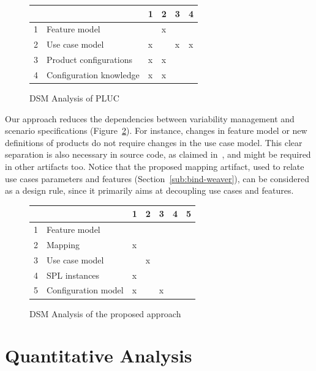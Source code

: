 \documentclass[11pt]{report}
\begin{document}
\begin{figure}[htb]
\centering
\begin{small}
\begin{tabular}{llllll} \hline
&  & 1 & 2 & 3 & 4 \\ \hline
1 & Feature model 			& 	& x	& 	&   	\\ 
2 & Use case model 		& x 	&  	&  x	&  x  \\ 
3 & Product configurations	& x 	& x	& 	&    	\\
4 & Configuration knowledge 	& x 	& x 	& 	&    	\\ \hline
\end{tabular}
\end{small}
 \caption{DSM Analysis of PLUC}
\label{dsm:pluc}
\end{figure}

Our approach reduces the dependencies between variability management and scenario specifications 
(Figure~\ref{dsm:cc}). For instance, changes in feature model or new definitions of products do not require changes in the use case model. This clear separation is also necessary in source code, as claimed in~\cite{alves-gpce-06, apel-icse2006}, and might be required in other artifacts too. Notice that the proposed mapping artifact, used to relate use cases parameters and features (Section~\ref{sub:bind-weaver}), can be considered as a design rule, since it primarily aims at decoupling use cases and features.  

\begin{figure}[h]
\centering
\begin{small}
\begin{tabular}{lllllll} \hline
& & 1 & 2 & 3 & 4 & 5 \\ \hline
1 & Feature model 		& 	& 	&      &  	&  	\\ 
2 & Mapping	 		& x	&	&	&	&  	\\
3 & Use case model 	&  	&  x	&  	&  	& 	\\
4 & SPL instances 		& x 	& 	& 	&   	& 	\\
5 & Configuration model 	& x 	&  	&  x	&  	& 	\\  \hline
\end{tabular}
\end{small}
 \caption{DSM Analysis of the proposed approach}
\label{dsm:cc}
\end{figure}   

\section{Quantitative Analysis}
\end{document}
